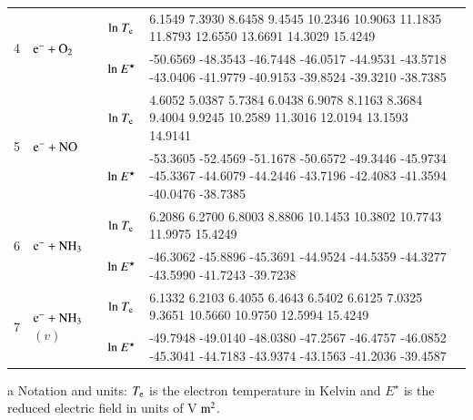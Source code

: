 \begin{table}[!htbp]
\begin{threeparttable}
\begin{tabular*}{\textwidth}{l@{\extracolsep{\fill}}lcll}
  \multirow{2}{*}{4} &  \multirow{2}{*}{ $\rm e^- + O_2  $   } & ${\rm ln}~T_{\rm e}$  & \tiny         6.1549    7.3930    8.6458    9.4545   10.2346   10.9063   11.1835   11.8793   12.6550   13.6691   14.3029   15.4249 \\ 

  &  & ${\rm ln}~E^\star$     & \tiny      -50.6569  -48.3543  -46.7448  -46.0517  -44.9531  -43.5718  -43.0406  -41.9779  -40.9153  -39.8524  -39.3210  -38.7385

  \\     
  \midrule  
  
  \multirow{2}{*}{5} &  \multirow{2}{*}{ $\rm e^- + NO  $   } & ${\rm ln}~T_{\rm e}$  & \tiny    4.6052    5.0387    5.7384    6.0438    6.9078    8.1163    8.3684    9.4004    9.9245   10.2589   11.3016   12.0194   13.1593   14.9141
 \\
  &  & ${\rm ln}~E^\star$     & \tiny    -53.3605  -52.4569  -51.1678  -50.6572  -49.3446  -45.9734  -45.3367  -44.6079  -44.2446  -43.7196  -42.4083  -41.3594  -40.0476  -38.7385
  \\     
  \midrule  
        
  \multirow{2}{*}{6} &  \multirow{2}{*}{ $\rm e^- + NH_3  $   } & ${\rm ln}~T_{\rm e}$  & \tiny 6.2086    6.2700    6.8003    8.8806   10.1453   10.3802   10.7743   11.9975   15.4249   \\
  
  &  & ${\rm ln}~E^\star$     & \tiny   -46.3062  -45.8896  -45.3691  -44.9524  -44.5359  -44.3277  -43.5990  -41.7243  -39.7238  \\
    \midrule  
  \multirow{2}{*}{7} &  \multirow{2}{*}{ $\rm e^- + NH_3$$(v)$   } & ${\rm ln}~T_{\rm e}$  & \tiny     6.1332    6.2103    6.4055    6.4643    6.5402    6.6125    7.0325    9.3651   10.5660   10.9750   12.5994   15.4249
  \\
  
  &  & ${\rm ln}~E^\star$     & \tiny     -49.7948  -49.0140  -48.0380  -47.2567  -46.4757  -46.0852  -45.3041  -44.7183  -43.9374  -43.1563  -41.2036  -39.4587
  \\  
                       
    \bottomrule
    \end{tabular*}
\begin{tablenotes}
\item[{a}] Notation and units: $T_{\rm e}$ is the electron temperature in Kelvin and $E^\star$ is the reduced electric field in units of V$\rm ~m^2$.
\end{tablenotes}
   \end{threeparttable}
\end{table}
